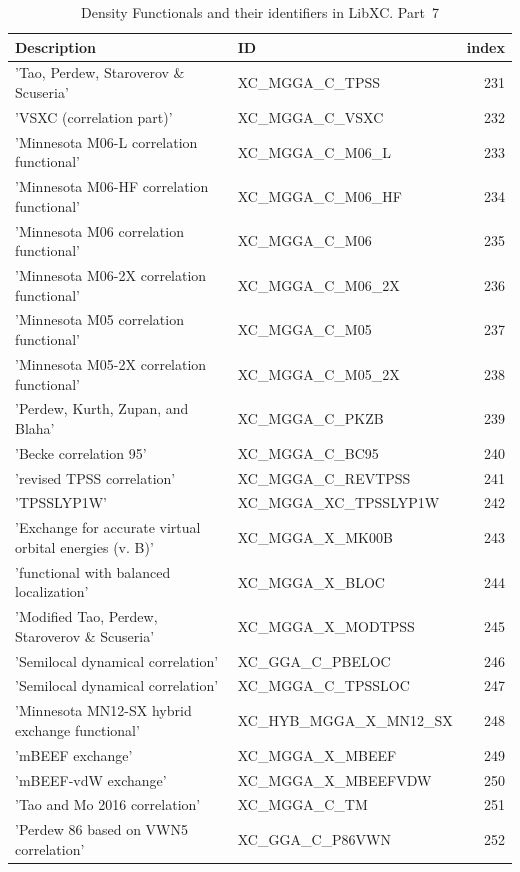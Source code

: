 \documentclass[final,12pt,makeidx,DIV=calc]{article}
\begin{document}
{{{{{{\begin{table}[!h]
\caption{Density Functionals and their identifiers in LibXC. Part~7}
\begin{center}
\begin{tabular}{llr}
\hline
\hline
Description & ID & index\\
\hline
  'Tao, Perdew, Staroverov \& Scuseria' & XC\_MGGA\_C\_TPSS  &231\\
  'VSXC (correlation part)' & XC\_MGGA\_C\_VSXC  &232\\
  'Minnesota M06-L correlation functional' & XC\_MGGA\_C\_M06\_L  &233\\
  'Minnesota M06-HF correlation functional' & XC\_MGGA\_C\_M06\_HF  &234\\
  'Minnesota M06 correlation functional' & XC\_MGGA\_C\_M06  &235\\
  'Minnesota M06-2X correlation functional' & XC\_MGGA\_C\_M06\_2X  &236\\
  'Minnesota M05 correlation functional' & XC\_MGGA\_C\_M05  &237\\
  'Minnesota M05-2X correlation functional' & XC\_MGGA\_C\_M05\_2X  &238\\
  'Perdew, Kurth, Zupan, and Blaha' & XC\_MGGA\_C\_PKZB  &239\\
  'Becke correlation 95' & XC\_MGGA\_C\_BC95  &240\\
  'revised TPSS correlation' & XC\_MGGA\_C\_REVTPSS  &241\\
  'TPSSLYP1W' & XC\_MGGA\_XC\_TPSSLYP1W  &242\\
  'Exchange for accurate virtual orbital energies (v. B)' & XC\_MGGA\_X\_MK00B  &243\\
  'functional with balanced localization' & XC\_MGGA\_X\_BLOC  &244\\
  'Modified Tao, Perdew, Staroverov \& Scuseria' & XC\_MGGA\_X\_MODTPSS  &245\\
  'Semilocal dynamical correlation' & XC\_GGA\_C\_PBELOC  &246\\
  'Semilocal dynamical correlation' & XC\_MGGA\_C\_TPSSLOC  &247\\
  'Minnesota MN12-SX hybrid exchange functional' & XC\_HYB\_MGGA\_X\_MN12\_SX  &248\\
  'mBEEF exchange' & XC\_MGGA\_X\_MBEEF  &249\\
  'mBEEF-vdW exchange' & XC\_MGGA\_X\_MBEEFVDW  &250\\
  'Tao and Mo 2016 correlation' & XC\_MGGA\_C\_TM  &251\\
  'Perdew 86 based on VWN5 correlation' & XC\_GGA\_C\_P86VWN  &252\\

\end{tabular}
\end{center}
\end{table}}}}}}}
\end{document}
